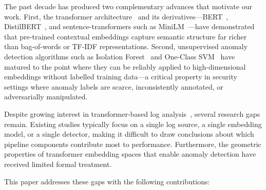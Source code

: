\documentclass[conference]{IEEEtran}
\begin{document}
The past decade has produced two complementary advances that motivate our
work.  First, the transformer architecture~\cite{vaswani2017} and its
derivatives---BERT~\cite{devlin2019}, DistilBERT~\cite{sanh2019}, and
sentence-transformers such as MiniLM~\cite{reimers2019}---have demonstrated
that pre-trained contextual embeddings capture semantic structure far richer
than bag-of-words or TF-IDF representations.  Second, unsupervised anomaly
detection algorithms such as Isolation Forest~\cite{liu2008} and
One-Class SVM~\cite{scholkopf2001} have matured to the point where they can
be reliably applied to high-dimensional embeddings without labelled training
data---a critical property in security settings where anomaly labels are
scarce, inconsistently annotated, or adversarially manipulated.

Despite growing interest in transformer-based log analysis~\cite{wu2025,
yan2024, chourasiya2025, nasirzadeh2025}, several research gaps remain.
Existing studies typically focus on a single log source, a single embedding
model, or a single detector, making it difficult to draw conclusions about
which pipeline components contribute most to performance.  Furthermore, the
geometric properties of transformer embedding spaces that enable anomaly
detection have received limited formal treatment.

This paper addresses these gaps with the following contributions:
\end{document}
